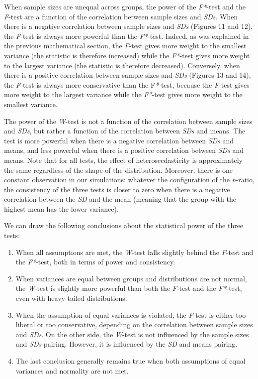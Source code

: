 \documentclass[man,floatsintext]{apa6}
\providecommand{\tightlist}{%
  \setlength{\itemsep}{0pt}\setlength{\parskip}{0pt}}
\begin{document}
When sample sizes are unequal across groups, the power of the \emph{F*}-test and the \emph{F}-test are a function of the correlation between sample sizes and \emph{SDs}. When there is a negative correlation between sample sizes and \emph{SDs} (Figures 11 and 12), the \emph{F}-test is always more powerful than the \emph{F*}-test. Indeed, as was explained in the previous mathematical section, the \emph{F}-test gives more weight to the smallest variance (the statistic is therefore increased) while the \emph{F*}-test gives more weight to the largest variance (the statistic is therefore decreased). Conversely, when there is a positive correlation between sample sizes and \emph{SDs} (Figures 13 and 14), the \emph{F}-test is always more conservative than the F\emph{*}-test, because the \emph{F}-test gives more weight to the largest variance while the \emph{F*}-test gives more weight to the smallest variance.

The power of the \emph{W}-test is not a function of the correlation between sample sizes and \emph{SDs}, but rather a function of the correlation between \emph{SDs} and means. The test is more powerful when there is a negative correlation between \emph{SDs} and means, and less powerful when there is a positive correlation between \emph{SDs} and means. Note that for all tests, the effect of heteroscedasticity is approximately the same regardless of the shape of the distribution. Moreover, there is one constant observation in our simulations: whatever the configuration of the \emph{n}-ratio, the consistency of the three tests is closer to zero when there is a negative correlation between the \emph{SD} and the mean (meaning that the group with the highest mean has the lower variance).

We can draw the following conclusions about the statistical power of the three tests:

\begin{enumerate}
\def\labelenumi{\arabic{enumi})}
\tightlist
\item
  When all assumptions are met, the \emph{W}-test falls slightly behind the \emph{F}-test and the \emph{F*}-test, both in terms of power and consistency.
\item
  When variances are equal between groups and distributions are not normal, the \emph{W}-test is slightly more powerful than both the \emph{F}-test and the \emph{F*}-test, even with heavy-tailed distributions.
\item
  When the assumption of equal variances is violated, the \emph{F}-test is either too liberal or too conservative, depending on the correlation between sample sizes and \emph{SDs}. On the other side, the \emph{W}-test is not influenced by the sample sizes and \emph{SDs} pairing. However, it is influenced by the \emph{SD} and means pairing.
\item
  The last conclusion generally remains true when both assumptions of equal variances and normality are not met.
\end{enumerate}
\end{document}
